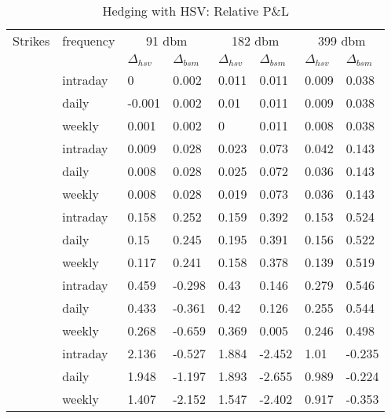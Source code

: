 \documentclass[12pt]{report}
\begin{document}
\begin{table}[ht]
\centering
\begin{tabular}{llllllll}
  \hline
  \hline
Strikes & frequency  &\multicolumn{2}{c}{91 dbm} & \multicolumn{2}{c}{182 dbm} & \multicolumn{2}{c}{399 dbm} \\ 
   &  & $\Delta_{hsv}$ & $\Delta_{bsm}$ & $\Delta_{hsv}$ & $\Delta_{bsm}$ & $\Delta_{hsv}$ & $\Delta_{bsm}$ \\ 
   \hdashline
  \multirow{3}{*}{140} & intraday & 0 & 0.002 & 0.011 & 0.011 & 0.009 & 0.038 \\ 
  & daily & -0.001 & 0.002 & 0.01 & 0.011 & 0.009 & 0.038 \\ 
  & weekly & 0.001 & 0.002 & 0 & 0.011 & 0.008 & 0.038 \\ 
  \hdashline
  \multirow{3}{*}{160} & intraday & 0.009 & 0.028 & 0.023 & 0.073 & 0.042 & 0.143 \\ 
  & daily & 0.008 & 0.028 & 0.025 & 0.072 & 0.036 & 0.143 \\ 
  & weekly & 0.008 & 0.028 & 0.019 & 0.073 & 0.036 & 0.143 \\ 
  \hdashline
  \multirow{3}{*}{186} & intraday & 0.158 & 0.252 & 0.159 & 0.392 & 0.153 & 0.524 \\ 
  & daily & 0.15 & 0.245 & 0.195 & 0.391 & 0.156 & 0.522 \\ 
  & weekly & 0.117 & 0.241 & 0.158 & 0.378 & 0.139 & 0.519 \\ 
  \hdashline 
  \multirow{3}{*}{200} & intraday & 0.459 & -0.298 & 0.43 & 0.146 & 0.279 & 0.546 \\ 
  & daily & 0.433 & -0.361 & 0.42 & 0.126 & 0.255 & 0.544 \\ 
  & weekly & 0.268 & -0.659 & 0.369 & 0.005 & 0.246 & 0.498 \\ 
  \hdashline 
  \multirow{3}{*}{230} & intraday & 2.136 & -0.527 & 1.884 & -2.452 & 1.01 & -0.235 \\ 
  & daily & 1.948 & -1.197 & 1.893 & -2.655 & 0.989 & -0.224 \\ 
  & weekly & 1.407 & -2.152 & 1.547 & -2.402 & 0.917 & -0.353 \\ 
   \hline
\end{tabular}
\caption{Hedging with HSV: Relative P\&L} 
\label{t:analysis:heston:pl}
\end{table}













\end{document}
